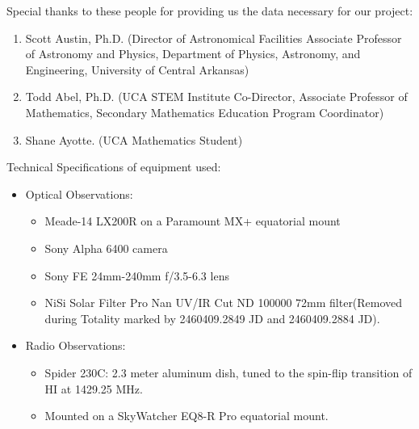 \noindent Special thanks to these people for providing us the data necessary for our project:

\begin{enumerate}
    \item Scott Austin, Ph.D. (Director of Astronomical Facilities Associate Professor of Astronomy and Physics, Department of Physics, Astronomy, and Engineering, University of Central Arkansas) 
    \item Todd Abel, Ph.D. (UCA STEM Institute Co-Director, Associate Professor of Mathematics, Secondary Mathematics Education Program Coordinator)
    \item Shane Ayotte. (UCA Mathematics Student)
\end{enumerate}

Technical Specifications of equipment used:
\begin{itemize}
    \item Optical Observations:
    \begin{itemize}
        \item Meade-14 LX200R on a Paramount MX+ equatorial mount
        \item Sony Alpha 6400 camera
        \item Sony FE 24mm-240mm f/3.5-6.3 lens
        \item NiSi Solar Filter Pro Nan UV/IR Cut ND 100000 72mm filter(Removed during Totality marked by 2460409.2849 JD and 2460409.2884 JD).
    \end{itemize}
    \item Radio Observations:
    \begin{itemize}
        \item Spider 230C: 2.3 meter aluminum dish, tuned to the spin-flip transition of HI at 1429.25 MHz.
        \item Mounted on a SkyWatcher EQ8-R Pro equatorial mount.
    \end{itemize}
\end{itemize}
